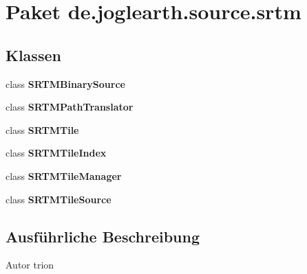 \section{Paket de.\-joglearth.\-source.\-srtm}
\label{namespacede_1_1joglearth_1_1source_1_1srtm}
\subsection*{Klassen}
\begin{DoxyCompactItemize}
\item 
class {\bf S\-R\-T\-M\-Binary\-Source}
\item 
class {\bf S\-R\-T\-M\-Path\-Translator}
\item 
class {\bf S\-R\-T\-M\-Tile}
\item 
class {\bf S\-R\-T\-M\-Tile\-Index}
\item 
class {\bf S\-R\-T\-M\-Tile\-Manager}
\item 
class {\bf S\-R\-T\-M\-Tile\-Source}
\end{DoxyCompactItemize}


\subsection{Ausführliche Beschreibung}
\begin{DoxyAuthor}{Autor}
trion 
\end{DoxyAuthor}
